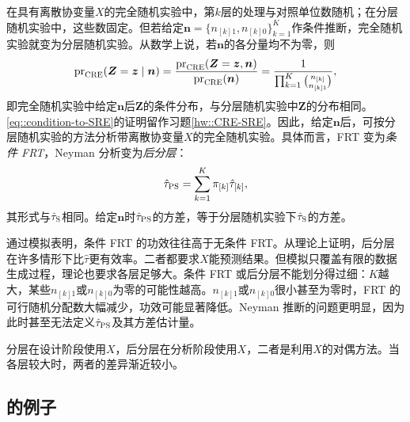 在具有离散协变量$X$的完全随机实验中，第$k$层的处理与对照单位数随机；在分层随机实验中，这些数固定。但若给定$\bm{n} = \{  n_{[k]1} , n_{[k]0} \}_{k=1}^K$作条件推断，完全随机实验就变为分层随机实验。从数学上说，若$\bm{n}$的各分量均不为零，则
\begin{equation}\label{eq::condition-to-SRE}
\textup{pr}_\textsc{CRE}(\bm{Z} = \bm{z} \mid\bm{n} )
= \frac{ \textup{pr}_\textsc{CRE}( \bm{Z} = \bm{z},  \bm{n})   }{ \textup{pr}_\textsc{CRE}(   \bm{n})   }
=  \frac{1}{  \prod_{k=1}^K  \binom{  n_{[k]} }{  n_{[k]1} } }  ,
\end{equation}
即完全随机实验中给定$\bm{n}$后$\bm{Z}$的条件分布，与分层随机实验中$\bm{Z}$的分布相同。\eqref{eq::condition-to-SRE}的证明留作习题\ref{hw::CRE-SRE}。因此，给定$\bm{n}$后，可按分层随机实验的方法分析带离散协变量$X$的完全随机实验。具体而言，FRT 变为{\it 条件 FRT}，Neyman 分析变为{\it 后分层}：
$$
\hat{\tau}_\textsc{PS} = \sum_{k=1}^K \pi_{[k]} \hat{\tau}_{[k]},
$$
其形式与$\hat{\tau}_\textsc{S}$相同。给定$\bm{n}$时$\hat{\tau}_\textsc{PS} $的方差，等于分层随机实验下$\hat{\tau}_\textsc{S}$的方差。  


\citet{hennessy2016conditional}通过模拟表明，条件 FRT 的功效往往高于无条件 FRT。\citet{miratrix:2013}从理论上证明，后分层在许多情形下比$\hat{\tau}$更有效率。二者都要求$X$能预测结果。但模拟只覆盖有限的数据生成过程，理论也要求各层足够大。条件 FRT 或后分层不能划分得过细：$K$越大，某些$n_{[k]1} $或$ n_{[k]0}$为零的可能性越高。$n_{[k]1} $或$ n_{[k]0}$很小甚至为零时，FRT 的可行随机分配数大幅减少，功效可能显著降低。Neyman 推断的问题更明显，因为此时甚至无法定义$\hat{\tau}_\textsc{PS}$及其方差估计量。 


分层在设计阶段使用$X$，后分层在分析阶段使用$X$，二者是利用$X$的对偶方法。当各层较大时，两者的差异渐近较小\citep{miratrix:2013}。

\subsection{\citet{meinert1970study}的例子}\label{sec::ps-merinert}

